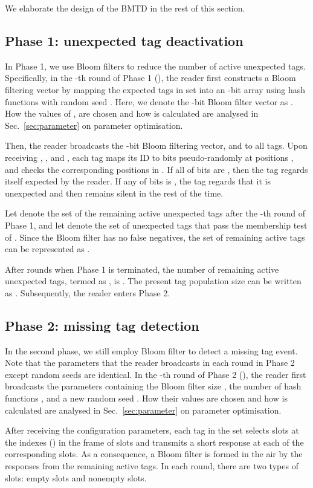 \documentclass[10pt, twocolumn]{IEEEtran}
\begin{document}
We elaborate the design of the BMTD in the rest of this section.

\subsection{Phase 1: unexpected tag deactivation}

In Phase 1, we use Bloom filters to reduce the number of active unexpected tags. Specifically, in the -th round of Phase 1 (), the reader first constructs a Bloom filtering vector by mapping the expected tags in set  into an -bit array using  hash functions with random seed . Here, we denote the -bit Bloom filter vector as . How the values of ,  are chosen and how  is calculated are analysed in Sec.~\ref{sec:parameter} on parameter optimisation.

Then, the reader broadcasts the -bit Bloom filtering vector,  and  to all tags. Upon receiving , , and , each tag maps its ID to  bits pseudo-randomly at positions , and checks the corresponding positions in . If all of  bits are , then the tag regards itself expected by the reader. If any of  bits is , the tag regards that it is unexpected and then remains silent in the rest of the time.

Let  denote the set of the remaining active unexpected tags after the -th round of Phase 1, and let  denote the set of unexpected tags that pass the membership test of . Since the Bloom filter has no false negatives, the set of remaining active tags can be represented as .

After  rounds when Phase 1 is terminated, the number of remaining active unexpected tags, termed as , is . The present tag population size can be written as . Subsequently, the reader enters Phase 2.

\subsection{Phase 2: missing tag detection}
In the second phase, we still employ Bloom filter to detect a missing tag event.
Note that the parameters that the reader broadcasts in each round in Phase 2 except random seeds are identical.
In the -th round of Phase 2 (), the reader first broadcasts the parameters containing the Bloom filter size , the number of hash functions , and a new random seed . How their values are chosen and how  is calculated are analysed in Sec.~\ref{sec:parameter} on parameter optimisation.

After receiving the configuration parameters, each tag in the set  selects  slots at the indexes  () in the frame of  slots and transmits a short response at each of the  corresponding slots. As a consequence, a Bloom filter is formed in the air by the responses from the remaining active tags. In each round, there are two types of slots: empty slots and nonempty slots.
\end{document}
